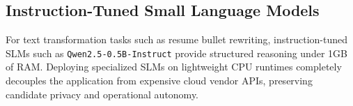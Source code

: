 \subsection{Instruction-Tuned Small Language Models}
For text transformation tasks such as resume bullet rewriting, instruction-tuned SLMs such as \texttt{Qwen2.5-0.5B-Instruct} \cite{qwen2.5} provide structured reasoning under 1GB of RAM. Deploying specialized SLMs on lightweight CPU runtimes completely decouples the application from expensive cloud vendor APIs, preserving candidate privacy and operational autonomy.

